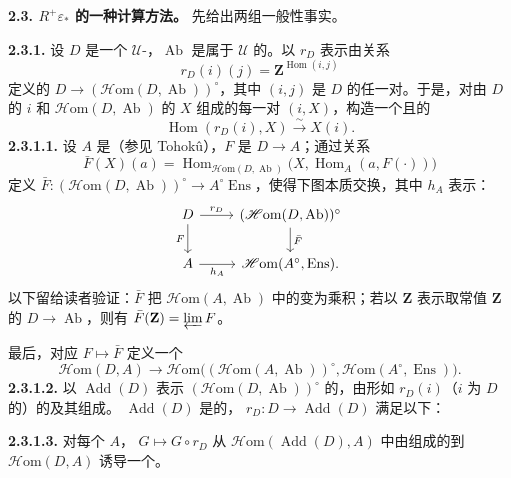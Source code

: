 \textbf{2.3. $R^+\varepsilon_*$ 的一种计算方法。} 先给出两组一般性事实。

\textbf{2.3.1.} 设 $D$ 是一个 $\mathcal U$-，$\operatorname{Ab}$ 是属于 $\mathcal U$ 的。以 $r_D$ 表示由关系
\[
r_D(i)(j)=\mathbf Z^{\operatorname{Hom}(i,j)}
\]
定义的 $D\to(\mathscr{H}\mathrm{om}(D,\operatorname{Ab}))^\circ$，其中 $(i,j)$ 是 $D$ 的任一对。于是，对由 $D$ 的 $i$ 和 $\mathscr{H}\mathrm{om}(D,\operatorname{Ab})$ 的 $X$ 组成的每一对 $(i,X)$，构造一个且的
\[
\operatorname{Hom}(r_D(i),X)\xrightarrow{\sim}X(i).
\]
\textbf{2.3.1.1.} 设 $A$ 是（参见 Tohokû），$F$ 是 $D\to A$；通过关系
\[
\bar F(X)(a)=\operatorname{Hom}_{\mathscr{H}\mathrm{om}(D,\operatorname{Ab})}
\bigl(X,\operatorname{Hom}_A(a,F(\cdot))\bigr)
\]
定义 $\bar F:(\mathscr{H}\mathrm{om}(D,\operatorname{Ab}))^\circ\to A^\circ\operatorname{Ens}$，使得下图本质交换，其中 $h_A$ 表示：
\[
\begin{tikzcd}
D\arrow[r,"r_D"]\arrow[d,"F"']&(\mathscr{H}\mathrm{om}(D,\operatorname{Ab}))^\circ\arrow[d,"\bar F"]\\
A\arrow[r,"h_A"']&\mathscr{H}\mathrm{om}(A^\circ,\operatorname{Ens}).
\end{tikzcd}
\]
以下留给读者验证：$\bar F$ 把 $\mathscr{H}\mathrm{om}(A,\operatorname{Ab})$ 中的变为乘积；若以 $\mathbf Z$ 表示取常值 $\mathbf Z$ 的 $D\to\operatorname{Ab}$，则有 $\bar F(\mathbf Z)=\varprojlim F$。

最后，对应 $F\mapsto\bar F$ 定义一个
\[
\mathscr{H}\mathrm{om}(D,A)\longrightarrow
\mathscr{H}\mathrm{om}\bigl((\mathscr{H}\mathrm{om}(A,\operatorname{Ab}))^\circ,
\mathscr{H}\mathrm{om}(A^\circ,\operatorname{Ens})\bigr).
\]
\textbf{2.3.1.2.} 以 $\operatorname{Add}(D)$ 表示 $(\mathscr{H}\mathrm{om}(D,\operatorname{Ab}))^\circ$ 的，由形如 $r_D(i)$（$i$ 为 $D$ 的）的及其组成。 $\operatorname{Add}(D)$ 是的， $r_D:D\to\operatorname{Add}(D)$ 满足以下：

\textbf{2.3.1.3.} 对每个 $A$， $G\mapsto G\circ r_D$ 从 $\mathscr{H}\mathrm{om}(\operatorname{Add}(D),A)$ 中由组成的到 $\mathscr{H}\mathrm{om}(D,A)$ 诱导一个。

